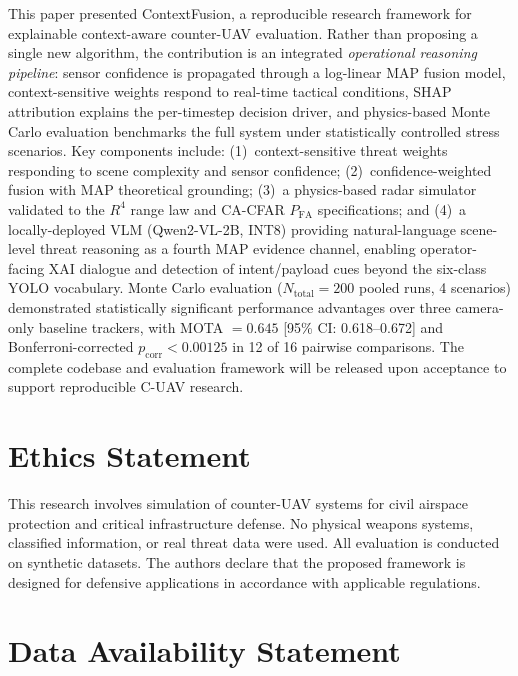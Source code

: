 \documentclass[drones,article,submit,pdftex]{Definitions/mdpi}
\begin{document}
This paper presented ContextFusion, a reproducible research framework for
explainable context-aware counter-UAV evaluation.
Rather than proposing a single new algorithm, the contribution is an integrated
\emph{operational reasoning pipeline}: sensor confidence is propagated through
a log-linear MAP fusion model, context-sensitive weights respond to real-time
tactical conditions, SHAP attribution explains the per-timestep decision driver,
and physics-based Monte Carlo evaluation benchmarks the full system under
statistically controlled stress scenarios.
Key components include: (1)~context-sensitive threat weights responding to
scene complexity and sensor confidence; (2)~confidence-weighted fusion with MAP
theoretical grounding; (3)~a physics-based radar simulator validated to the
$R^4$ range law and CA-CFAR $P_\text{FA}$ specifications; and
(4)~a locally-deployed VLM (Qwen2-VL-2B, INT8) providing natural-language
scene-level threat reasoning as a fourth MAP evidence channel, enabling
operator-facing XAI dialogue and detection of intent/payload cues beyond
the six-class YOLO vocabulary.
Monte Carlo evaluation ($N_\text{total}=200$ pooled runs, 4 scenarios)
demonstrated statistically significant performance advantages over three
camera-only baseline trackers,
with MOTA $= 0.645$ [95\% CI: 0.618--0.672] and Bonferroni-corrected
$p_\text{corr} < 0.00125$ in 12 of 16 pairwise comparisons.
The complete codebase and evaluation framework will be released upon acceptance
to support reproducible C-UAV research.

\section*{Ethics Statement}

This research involves simulation of counter-UAV systems for civil airspace
protection and critical infrastructure defense.
No physical weapons systems, classified information, or real threat data were
used. All evaluation is conducted on synthetic datasets.
The authors declare that the proposed framework is designed for defensive
applications in accordance with applicable regulations.

\section*{Data Availability Statement}
\end{document}
